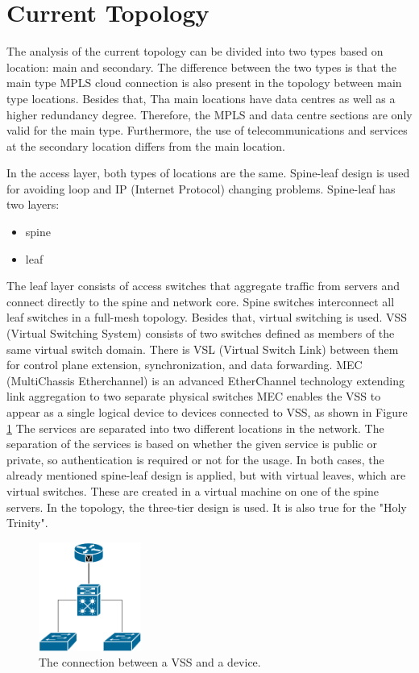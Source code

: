 \documentclass{article}
\begin{document}
\section{Current Topology}
The analysis of the current topology can be divided into two types based on location: main and secondary. The difference between the two types is that the main type MPLS cloud connection is also present in the topology between main type locations. Besides that, Tha main locations have data centres as well as a higher redundancy degree. Therefore, the MPLS and data centre sections are only valid for the main type. Furthermore, the use of telecommunications and services at the secondary location differs from the main location.

In the access layer, both types of locations are the same. Spine-leaf design is used for avoiding loop and IP (Internet Protocol) changing problems. Spine-leaf has two layers:
\begin{itemize}
    \item spine
    \item leaf
\end{itemize}

The leaf layer consists of access switches that aggregate traffic from servers and connect directly to the spine and network core. Spine switches interconnect all leaf switches in a full-mesh topology. Besides that, virtual switching is used. VSS (Virtual Switching System) consists of two switches defined as members of the same virtual switch domain. There is VSL (Virtual Switch Link) between them for control plane extension, synchronization, and data forwarding. MEC (MultiChassis Etherchannel) is an advanced EtherChannel technology extending link aggregation to two separate physical switches MEC enables the VSS to appear as a single logical device to devices connected to VSS\cite{VSS}, as shown in Figure \ref{fig:vss} The services are separated into two different locations in the network. The separation of the services is based on whether the given service is public or private, so authentication is required or not for the usage. In both cases, the already mentioned spine-leaf design is applied, but with virtual leaves, which are virtual switches. These are created in a virtual machine on one of the spine servers. In the topology, the three-tier design is used. It is also true for the "Holy Trinity".

\begin{figure}
\centering
\includegraphics[width=0.3\textwidth]{virtual_switch.png}
\caption{\label{fig:vss}The connection between a VSS and a device.}
\end{figure}
\end{document}
